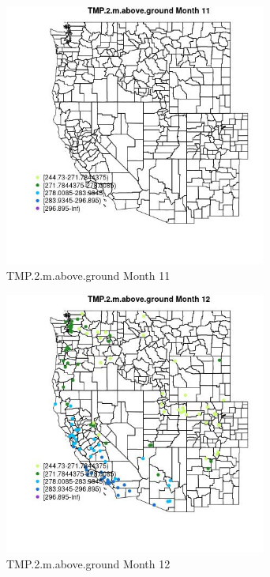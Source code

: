 \begin{figure} 
\centering  
\includegraphics[width=0.77\textwidth]{Code_Outputs/Report_ML_input_PM25_Step4_part_e_de_duplicated_aveswNAs_MapObsMo11TMP2maboveground.jpg} 
\caption{\label{fig:Report_ML_input_PM25_Step4_part_e_de_duplicated_aveswNAsMapObsMo11TMP2maboveground}TMP.2.m.above.ground Month 11} 
\end{figure} 
 

\begin{figure} 
\centering  
\includegraphics[width=0.77\textwidth]{Code_Outputs/Report_ML_input_PM25_Step4_part_e_de_duplicated_aveswNAs_MapObsMo12TMP2maboveground.jpg} 
\caption{\label{fig:Report_ML_input_PM25_Step4_part_e_de_duplicated_aveswNAsMapObsMo12TMP2maboveground}TMP.2.m.above.ground Month 12} 
\end{figure} 
 


